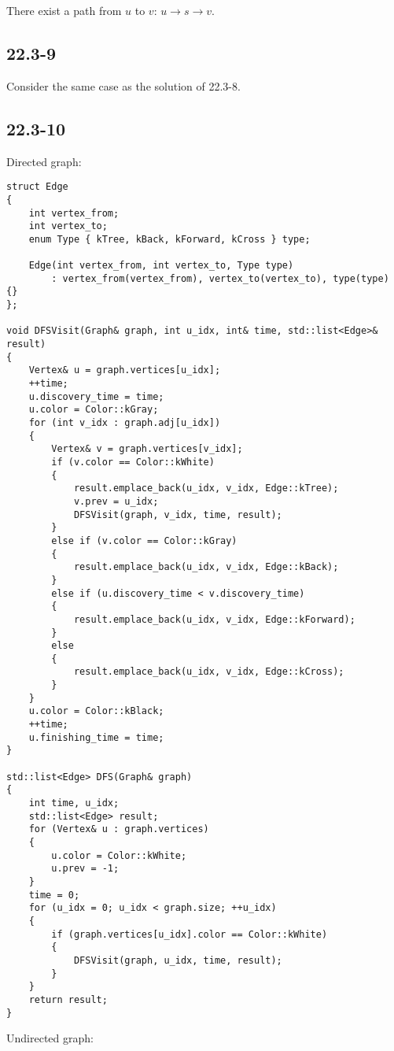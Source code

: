 There exist a path from $u$ to $v$:
$u \rightarrow s \rightarrow v$.

\subsection*{22.3-9}

Consider the same case as the solution of 22.3-8.

\subsection*{22.3-10}

Directed graph:

\begin{verbatim}
struct Edge
{
    int vertex_from;
    int vertex_to;
    enum Type { kTree, kBack, kForward, kCross } type;

    Edge(int vertex_from, int vertex_to, Type type) 
        : vertex_from(vertex_from), vertex_to(vertex_to), type(type) {}
};

void DFSVisit(Graph& graph, int u_idx, int& time, std::list<Edge>& result)
{
    Vertex& u = graph.vertices[u_idx];
    ++time;
    u.discovery_time = time;
    u.color = Color::kGray;
    for (int v_idx : graph.adj[u_idx])
    {
        Vertex& v = graph.vertices[v_idx];
        if (v.color == Color::kWhite)
        {
            result.emplace_back(u_idx, v_idx, Edge::kTree);
            v.prev = u_idx;
            DFSVisit(graph, v_idx, time, result);
        }
        else if (v.color == Color::kGray)
        {
            result.emplace_back(u_idx, v_idx, Edge::kBack);
        }
        else if (u.discovery_time < v.discovery_time)
        {
            result.emplace_back(u_idx, v_idx, Edge::kForward);
        }
        else
        {
            result.emplace_back(u_idx, v_idx, Edge::kCross);
        }
    }
    u.color = Color::kBlack;
    ++time;
    u.finishing_time = time;
}

std::list<Edge> DFS(Graph& graph)
{
    int time, u_idx;
    std::list<Edge> result;
    for (Vertex& u : graph.vertices)
    {
        u.color = Color::kWhite;
        u.prev = -1;
    }
    time = 0;
    for (u_idx = 0; u_idx < graph.size; ++u_idx)
    {
        if (graph.vertices[u_idx].color == Color::kWhite)
        {
            DFSVisit(graph, u_idx, time, result);
        }
    }
    return result;
}
\end{verbatim}

Undirected graph:

